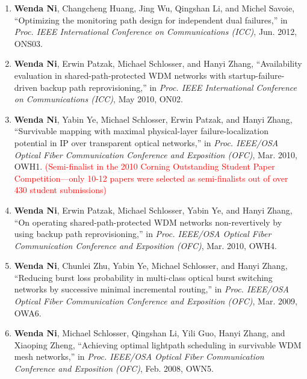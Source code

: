 \documentclass[letterpaper,11pt]{article}
\begin{document}
\begin{CJK}{UTF8}{gbsn}
\begin{enumerate}
\item
\textbf{Wenda Ni}, Changcheng Huang, Jing Wu, Qingshan Li, and Michel Savoie, ``Optimizing the monitoring path design for independent dual failures,'' in \textit{Proc. IEEE International Conference on Communications (ICC)}, Jun. 2012, ONS03.

\item
\textbf{Wenda Ni}, Erwin Patzak, Michael Schlosser, and Hanyi Zhang, ``Availability evaluation in shared-path-protected WDM networks with startup-failure-driven backup path reprovisioning,'' in \textit{Proc. IEEE International Conference on Communications (ICC)}, May 2010, ON02.

\item
\textbf{Wenda Ni}, Yabin Ye, Michael Schlosser, Erwin Patzak, and Hanyi Zhang, ``Survivable mapping with maximal physical-layer failure-localization potential in IP over transparent optical networks,'' in \textit{Proc. IEEE/OSA Optical Fiber Communication Conference and Exposition (OFC)}, Mar. 2010, OWH1. \textcolor{Red}{(Semi-finalist in the 2010 Corning Outstanding Student Paper Competition---only 10-12 papers were selected as semi-finalists out of over 430 student submissions)}

\item
\textbf{Wenda Ni}, Erwin Patzak, Michael Schlosser, Yabin Ye, and Hanyi Zhang, ``On operating shared-path-protected WDM networks non-revertively by using backup path reprovisioning,'' in \textit{Proc. IEEE/OSA Optical Fiber Communication Conference and Exposition (OFC)}, Mar. 2010, OWH4.

\item
\textbf{Wenda Ni}, Chunlei Zhu, Yabin Ye, Michael Schlosser, and Hanyi Zhang, ``Reducing burst loss probability in multi-class optical burst switching networks by successive minimal incremental routing,'' in \textit{Proc. IEEE/OSA Optical Fiber Communication Conference and Exposition (OFC)}, Mar. 2009, OWA6.

\item
\textbf{Wenda Ni}, Michael Schlosser, Qingshan Li, Yili Guo, Hanyi Zhang, and Xiaoping Zheng, ``Achieving optimal lightpath scheduling in survivable WDM mesh networks,'' in \textit{Proc. IEEE/OSA Optical Fiber Communication Conference and Exposition (OFC)}, Feb. 2008, OWN5.


\end{enumerate}
\end{CJK}
\end{document}

